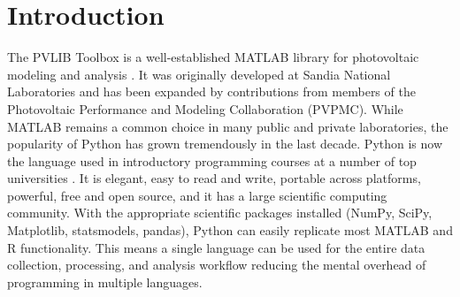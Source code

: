 \documentclass[conference]{IEEEtran}
\begin{document}
%



\section{Introduction}

The PVLIB Toolbox is a well-established MATLAB library for photovoltaic modeling and analysis \cite{pvlibstein}. 
It was originally developed at Sandia National Laboratories and has been expanded by contributions from members of the Photovoltaic Performance and Modeling Collaboration (PVPMC).
While MATLAB remains a common choice in many public and private laboratories, the popularity of Python has grown tremendously in the last decade. 
Python is now the language used in introductory programming courses at a number of top universities \cite{Per11, acmpython}. 
It is elegant, easy to read and write, portable across platforms, powerful, free and open source, and it has a large scientific computing community. 
With the appropriate scientific packages installed (NumPy, SciPy, Matplotlib, statsmodels, pandas), Python can easily replicate most MATLAB and R functionality. 
This means a single language can be used for the entire data collection, processing, and analysis workflow reducing the mental overhead of programming in multiple languages. 
\end{document}
